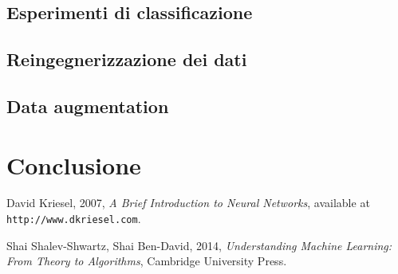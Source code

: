 \documentclass[12pt, twoside, letterpaper]{report}
\begin{document}
		\section{Esperimenti di classificazione}
		\section{Reingegnerizzazione dei dati}
		\section{Data augmentation}

	\chapter*{Conclusione}	  
	
	\begin{thebibliography}{9}
		 David Kriesel, 2007, \textit{A Brief Introduction to Neural Networks}, available at \texttt{http://www.dkriesel.com}.

		 Shai Shalev-Shwartz, Shai Ben-David, 2014, \textit{Understanding Machine Learning: From Theory to Algorithms}, Cambridge University Press.

	\end{thebibliography}
	
\end{document}
